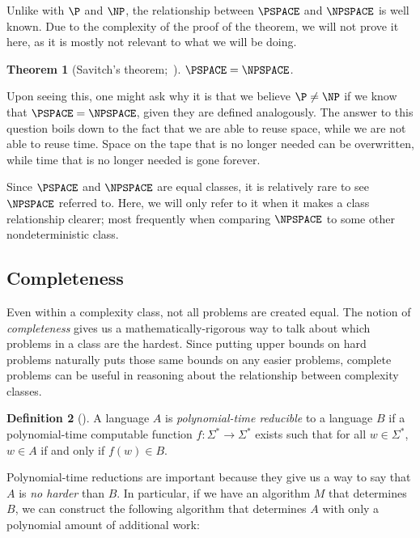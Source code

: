\documentclass{reedthesis}
\theoremstyle{plain}
\newtheorem{thm}{Theorem}[section]
\theoremstyle{definition}
\newtheorem{defn}[thm]{Definition}
\theoremstyle{remark}
\numberwithin{equation}{section}
\begin{document}
Unlike with $\P$ and $\NP$, the relationship between $\PSPACE$ and $\NPSPACE$ is
well known. Due to the complexity of the proof of the theorem, we will not prove
it here, as it is mostly not relevant to what we will be doing.

\begin{thm}[{Savitch's theorem;~\cite{Sav70}}]\label{thm:savitch}
  $\PSPACE = \NPSPACE$.
\end{thm}

Upon seeing this, one might ask why it is that we believe $\P \ne \NP$ if we know
that $\PSPACE = \NPSPACE$, given they are defined analogously. The answer to
this question boils down to the fact that we are able to reuse space, while we
are not able to reuse time. Space on the tape that is no longer needed can be
overwritten, while time that is no longer needed is gone forever.

Since $\PSPACE$ and $\NPSPACE$ are equal classes, it is relatively rare to see
$\NPSPACE$ referred to. Here, we will only refer to it when it makes a class
relationship clearer; most frequently when comparing $\NPSPACE$ to some other
nondeterministic class.

\subsection{Completeness}

Even within a complexity class, not all problems are created equal. The notion
of \emph{completeness} gives us a mathematically-rigorous way to talk about
which problems in a class are the hardest. Since putting upper bounds on hard
problems naturally puts those same bounds on any easier problems, complete
problems can be useful in reasoning about the relationship between complexity
classes.

\begin{defn}[{\cite[Def.\ 7.29]{Sip97}}]\label{def:p-reduction}
  A language $A$ is \emph{polynomial-time reducible} to a language $B$ if a
  polynomial-time computable function $f: \Sigma^{*} \rightarrow \Sigma^{*}$ exists such that for
  all $w \in \Sigma^{*}$, $w \in A$ if and only if $f(w) \in B$.
\end{defn}

Polynomial-time reductions are important because they give us a way to say that
$A$ is \emph{no harder} than $B$. In particular, if we have an algorithm $M$
that determines $B$, we can construct the following algorithm that determines
$A$ with only a polynomial amount of additional work:
\end{document}
